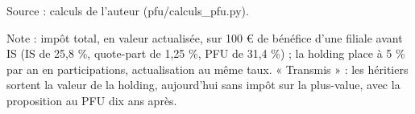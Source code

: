 Source : calculs de l'auteur (pfu/calculs\_pfu.py).\par Note : impôt total, en valeur actualisée, sur 100 \euro{} de bénéfice d'une filiale avant IS (IS de 25,8 \%, quote-part de 1,25 \%, PFU de 31,4 \%) ; la holding place à 5 \% par an en participations, actualisation au même taux. « Transmis » : les héritiers sortent la valeur de la holding, aujourd'hui sans impôt sur la plus-value, avec la proposition au PFU dix ans après.
